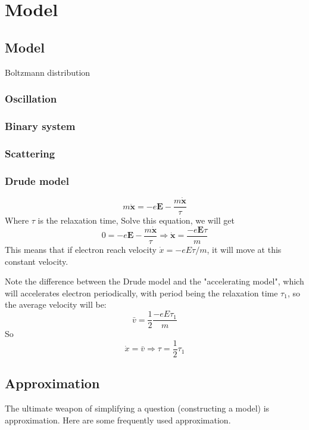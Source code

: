 \chapter{Model}
\section{Model}

Boltzmann distribution

\subsection{Oscillation}

\subsection{Binary system}

\subsection{Scattering}

\subsection{Drude model}
\begin{equation}
    m\ddot{\bm{x}} = -e\bm{E} - \frac{m\dot{\bm{x}}}{\tau}
\end{equation}
Where $\tau$ is the relaxation time, Solve this equation, we will get
\[
    0 = -e\bm{E} - \frac{m\dot{\bm{x}}}{\tau} \Longrightarrow
    \dot{\bm{x}} = \frac{-e\bm{E}\tau}{m}
\]
This means that if electron reach velocity $\dot{x} = -eE\tau/m$, it will move at this constant velocity.

Note the difference between the Drude model and the "accelerating model", which will accelerates electron periodically, with period being the relaxation time $\tau_1$, so the average velocity will be:
\[
    \bar{v} = \frac{1}{2}\frac{-eE\tau_1}{m}
\]
So 
\[
    \dot{x} = \bar{v}  \Longrightarrow \tau = \frac{1}{2}\tau_1
\]


\section{Approximation}
The ultimate weapon of simplifying a question (constructing a model)
is approximation. Here are some frequently used approximation.

